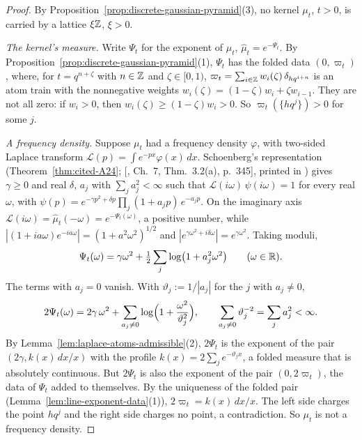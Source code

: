 \begin{proof}
\leanok
By Proposition~\ref{prop:discrete-gaussian-pyramid}(3), no kernel $\mu_t$, $t > 0$, is carried by a
lattice $\xi\mathbb{Z}$, $\xi > 0$.

\emph{The kernel's \Levy{} measure.} Write $\Psi_t$ for the exponent of $\mu_t$,
$\widehat\mu_t = e^{-\Psi_t}$. By Proposition~\ref{prop:discrete-gaussian-pyramid}(1), $\Psi_t$ has
the folded data $(0, \varpi_t)$, where, for $t = q^{n+\zeta}$ with $n \in \mathbb{Z}$ and $\zeta \in [0, 1)$,
$\varpi_t = \sum_{i \in \mathbb{Z}}w_i(\zeta)\,\delta_{hq^{i+n}}$ is an atom train with the nonnegative
weights $w_i(\zeta) = (1 - \zeta)w_i + \zeta w_{i-1}$. They are not all zero: if $w_i > 0$, then
$w_i(\zeta) \ge (1 - \zeta)w_i > 0$. So $\varpi_t(\{hq^j\}) > 0$ for some $j$.

\emph{A \Polya{} frequency density.} Suppose $\mu_t$ had a \Polya{} frequency density $\varphi$,
with two-sided Laplace transform $\mathcal{L}(p) = \int e^{-px}\varphi(x)\,dx$. Schoenberg's
representation (Theorem~\ref{thm:cited-A24}; [, Ch.~7, Thm.~3.2(a),
p.~345], printed in ) gives $\gamma \ge 0$ and real
$\delta$, $a_j$ with $\sum_ja_j^2 < \infty$ such that
$\mathcal{L}(i\omega)\,\psi(i\omega) = 1$ for every real $\omega$, with
$\psi(p) = e^{-\gamma p^2 + \delta p}\prod_j(1 + a_jp)\,e^{-a_jp}$. On the imaginary axis
$\mathcal{L}(i\omega) = \widehat\mu_t(-\omega) = e^{-\Psi_t(\omega)}$, a positive number, while
$|(1 + ia\omega)e^{-ia\omega}| = (1 + a^2\omega^2)^{1/2}$ and $|e^{\gamma\omega^2 + i\delta\omega}| =
e^{\gamma\omega^2}$. Taking moduli,
\[
  \Psi_t(\omega) = \gamma\omega^2 + \tfrac12\sum_j\log\bigl(1 + a_j^2\omega^2\bigr)
  \qquad (\omega \in \mathbb{R}).
\]
The terms with $a_j = 0$ vanish. With $\vartheta_j := 1/|a_j|$ for the $j$ with $a_j \ne 0$,
\[
  2\Psi_t(\omega) = 2\gamma\,\omega^2 + \sum_{a_j \ne 0}\log\Bigl(1 + \frac{\omega^2}{\vartheta_j^2}\Bigr),
  \qquad \sum_{a_j \ne 0}\vartheta_j^{-2} = \sum_ja_j^2 < \infty .
\]
By Lemma~\ref{lem:laplace-atoms-admissible}(2), $2\Psi_t$ is the exponent of the pair
$(2\gamma, k(x)\,dx/x)$ with the profile $k(x) = 2\sum_je^{-\vartheta_jx}$, a folded \Levy{} measure
that is absolutely continuous. But $2\Psi_t$ is also the exponent of the pair $(0, 2\varpi_t)$, the
data of $\Psi_t$ added to themselves. By the uniqueness of the folded pair
(Lemma~\ref{lem:line-exponent-data}(1)), $2\varpi_t = k(x)\,dx/x$. The left side charges the point
$hq^j$ and the right side charges no point, a contradiction. So $\mu_t$ is not a \Polya{}
frequency density.
\end{proof}

